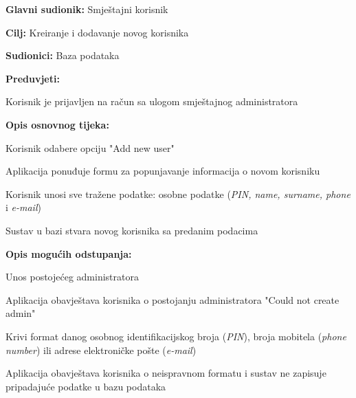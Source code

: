 					
					\noindent {}
					\begin{packed_item}
						\item \textbf{Glavni sudionik:} Smještajni korisnik
						\item  \textbf{Cilj:} Kreiranje i dodavanje novog korisnika
						\item  \textbf{Sudionici:} Baza podataka
						\item  \textbf{Preduvjeti:}
						\item[] \begin{packed_enum}
							\item Korisnik je prijavljen na račun sa ulogom smještajnog administratora
						\end{packed_enum}
						
						\item  \textbf{Opis osnovnog tijeka:}
						\item[] \begin{packed_enum}
							\item Korisnik odabere opciju "Add new user"
							\item Aplikacija ponuđuje formu za popunjavanje informacija o novom korisniku
							\item Korisnik unosi sve tražene podatke: osobne podatke (\textit{PIN, name, surname, phone} i \textit{e-mail})
							\item Sustav u bazi stvara novog korisnika sa predanim podacima
						\end{packed_enum}
						
						\item  \textbf{Opis mogućih odstupanja:}
						\item[] \begin{packed_item}
							\item[3.a] Unos postojećeg administratora
							\item[] \begin{packed_enum}
								\item Aplikacija obavještava korisnika o postojanju administratora "Could not create admin"
									\end{packed_enum}
							\item[3.b] Krivi format danog osobnog identifikacijskog broja (\textit{PIN}), broja mobitela (\textit{phone number}) ili adrese elektroničke pošte (\textit{e-mail})
							\item[] \begin{packed_enum}
								\item Aplikacija obavještava korisnika o neispravnom formatu i sustav ne zapisuje pripadajuće podatke u bazu podataka
									\end{packed_enum}
						\end{packed_item}
					\end{packed_item}
					

